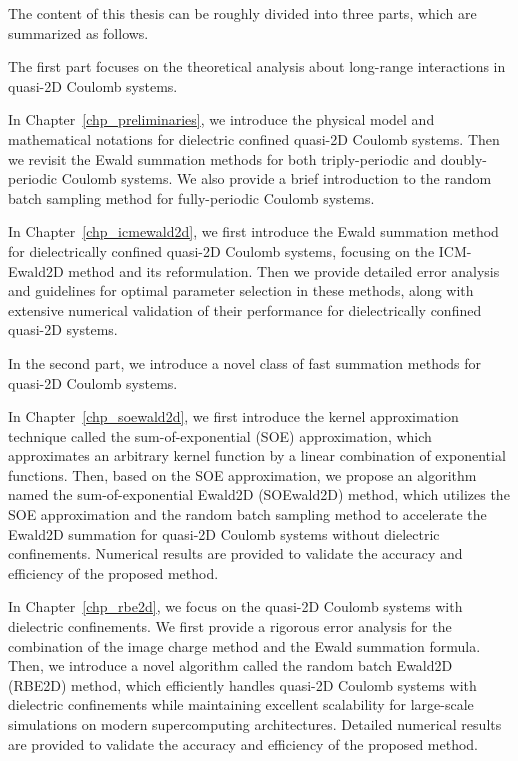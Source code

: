 The content of this thesis can be roughly divided into three parts, which are summarized as follows.

The first part focuses on the theoretical analysis about long-range interactions in quasi-2D Coulomb systems.

In Chapter~\ref{chp_preliminaries}, we introduce the physical model and mathematical notations for dielectric confined quasi-2D Coulomb systems.
Then we revisit the Ewald summation methods for both triply-periodic and doubly-periodic Coulomb systems.
We also provide a brief introduction to the random batch sampling method for fully-periodic Coulomb systems.

In Chapter~\ref{chp_icmewald2d}, we first introduce the Ewald summation method for dielectrically confined quasi-2D Coulomb systems, focusing on the ICM-Ewald2D method and its reformulation.
Then we provide detailed error analysis and guidelines for optimal parameter selection in these methods, along with extensive numerical validation of their performance for dielectrically confined quasi-2D systems.

In the second part, we introduce a novel class of fast summation methods for quasi-2D Coulomb systems.

In Chapter~\ref{chp_soewald2d}, we first introduce the kernel approximation technique called the sum-of-exponential (SOE) approximation, which approximates an arbitrary kernel function by a linear combination of exponential functions.
Then, based on the SOE approximation, we propose an algorithm named the sum-of-exponential Ewald2D (SOEwald2D) method, which utilizes the SOE approximation and the random batch sampling method to accelerate the Ewald2D summation for quasi-2D Coulomb systems without dielectric confinements.
Numerical results are provided to validate the accuracy and efficiency of the proposed method.

In Chapter~\ref{chp_rbe2d}, we focus on the quasi-2D Coulomb systems with dielectric confinements.
We first provide a rigorous error analysis for the combination of the image charge method and the Ewald summation formula.
Then, we introduce a novel algorithm called the random batch Ewald2D (RBE2D) method, which efficiently handles quasi-2D Coulomb systems with dielectric confinements while maintaining excellent scalability for large-scale simulations on modern supercomputing architectures.
Detailed numerical results are provided to validate the accuracy and efficiency of the proposed method.


